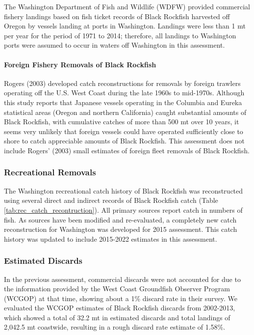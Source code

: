 \documentclass[11pt,
  english,
  letterpaper,
]{article}
\begin{document}
The Washington Department of Fish and Wildlife (WDFW) provided commercial fishery landings based on fish ticket records of Black Rockfish harvested off Oregon by vessels landing at ports in Washington. Landings were less than 1 mt per year for the period of 1971 to 2014; therefore, all landings to Washington ports were assumed to occur in waters off Washington in this assessment.

\hypertarget{foreign-fishery-removals-of-black-rockfish}{%
\paragraph{Foreign Fishery Removals of Black Rockfish}\label{foreign-fishery-removals-of-black-rockfish}}

Rogers (2003) developed catch reconstructions for removals by foreign trawlers operating off the U.S. West Coast during the late 1960s to mid-1970s. Although this study reports that Japanese vessels operating in the Columbia and Eureka statistical areas (Oregon and northern California) caught substantial amounts of Black Rockfish, with cumulative catches of more than 500 mt over 10 years, it seems very unlikely that foreign vessels could have operated sufficiently close to shore to catch appreciable amounts of Black Rockfish. This assessment does not include Rogers' (2003) small estimates of foreign fleet removals of Black Rockfish.

\hypertarget{recreational-removals}{%
\subsubsection{Recreational Removals}\label{recreational-removals}}

The Washington recreational catch history of Black Rockfish was reconstructed using several direct and indirect records of Black Rockfish catch (Table \ref{tab:rec_catch_recontruction}). All primary sources report catch in numbers of fish. As sources have been modified and re-evaluated, a completely new catch reconstruction for Washington was developed for 2015 assessment. This catch history was updated to include 2015-2022 estimates in this assessment.

\hypertarget{estimated-discards}{%
\subsubsection{Estimated Discards}\label{estimated-discards}}

In the previous assessment, commercial discards were not accounted for due to the information provided by the West Coast Groundfish Observer Program (WCGOP) at that time, showing about a 1\% discard rate in their survey. We evaluated the WCGOP estimates of Black Rockfish discards from 2002-2013, which showed a total of 32.2 mt in estimated discards and total landings of 2,042.5 mt coastwide, resulting in a rough discard rate estimate of 1.58\%.
\end{document}
